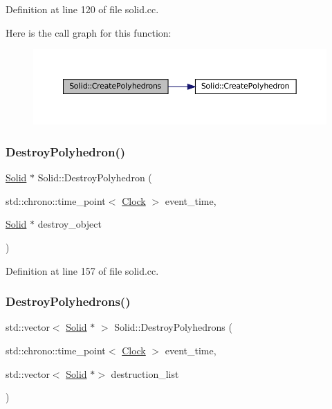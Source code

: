 Definition at line 120 of file solid.\+cc.

Here is the call graph for this function\+:\nopagebreak
\begin{figure}[H]
\begin{center}
\leavevmode
\includegraphics[width=350pt]{class_solid_a40b2ea07e384aff138ba139c3c84f525_cgraph}
\end{center}
\end{figure}
\mbox{\label{class_solid_a0841900d8ef4b82292ac027c4852b59b}} 
\subsubsection{\texorpdfstring{Destroy\+Polyhedron()}{DestroyPolyhedron()}}
{\footnotesize\ttfamily \mbox{\hyperlink{class_solid}{Solid}} $\ast$ Solid\+::\+Destroy\+Polyhedron (\begin{DoxyParamCaption}\item[{std\+::chrono\+::time\+\_\+point$<$ \mbox{\hyperlink{universe_8h_a0ef8d951d1ca5ab3cfaf7ab4c7a6fd80}{Clock}} $>$}]{event\+\_\+time,  }\item[{\mbox{\hyperlink{class_solid}{Solid}} $\ast$}]{destroy\+\_\+object }\end{DoxyParamCaption})}



Definition at line 157 of file solid.\+cc.

\mbox{\label{class_solid_ab1652ee511ed51bbe6a0a3b1854b7974}} 
\subsubsection{\texorpdfstring{Destroy\+Polyhedrons()}{DestroyPolyhedrons()}}
{\footnotesize\ttfamily std\+::vector$<$ \mbox{\hyperlink{class_solid}{Solid}} $\ast$ $>$ Solid\+::\+Destroy\+Polyhedrons (\begin{DoxyParamCaption}\item[{std\+::chrono\+::time\+\_\+point$<$ \mbox{\hyperlink{universe_8h_a0ef8d951d1ca5ab3cfaf7ab4c7a6fd80}{Clock}} $>$}]{event\+\_\+time,  }\item[{std\+::vector$<$ \mbox{\hyperlink{class_solid}{Solid}} $\ast$$>$}]{destruction\+\_\+list }\end{DoxyParamCaption})}



